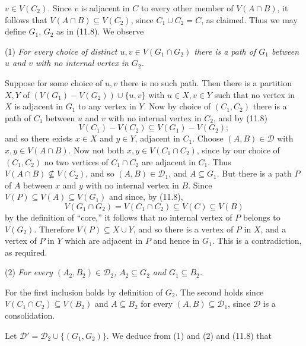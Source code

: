 \noindent $v \in V(C_2)$. Since $v$ is adjacent in $C$ to every other member of $V(A \cap B)$, it follows that $V(A \cap B) \subseteq V(C_2)$, since $C_1 \cup C_2 = C$, as claimed. Thus we may define $G_1$, $G_2$ as in (11.8). We observe

\hspace*{12pt}(1) \textit{For every choice of distinct $u, v \in V(G_1 \cap G_2)$ there is a path of $G_1$ between $u$ and $v$ with no internal vertex in $G_2$.}

Suppose for some choice of $u, v$ there is no such path. Then there is a partition $X, Y$ of $(V(G_1) - V(G_2)) \cup \{u, v\}$ with $u \in X, v \in Y$ such that no vertex in $X$ is adjacent in $G_1$ to any vertex in $Y$. Now by choice of $(C_1, C_2)$ there is a path of $C_1$ between $u$ and $v$ with no internal vertex in $C_2$, and by (11.8)
\begin{equation*}
V(C_1) - V(C_2) \subseteq V(G_1) - V(G_2);
\end{equation*}
and so there exists $x \in X$ and $y \in Y$, adjacent in $C_1$. Choose $(A, B) \in \mathcal{D}$ with $x, y \in V(A \cap B)$. Now not both $x, y \in V(C_1 \cap C_2)$, since by our choice of $(C_1, C_2)$ no two vertices of $C_1 \cap C_2$ are adjacent in $C_1$. Thus $V(A \cap B) \not\subseteq V(C_2)$, and so $(A, B) \in \mathcal{D}_1$, and $A \subseteq G_1$. But there is a path $P$ of $A$ between $x$ and $y$ with no internal vertex in $B$. Since $V(P) \subseteq V(A) \subseteq V(G_1)$ and since, by (11.8),
\begin{equation*}
V(G_1 \cap G_2) = V(C_1 \cap C_2) \subseteq V(C) \subseteq V(B)
\end{equation*}
by the definition of ``core,'' it follows that no internal vertex of $P$ belongs to $V(G_2)$. Therefore $V(P) \subseteq X \cup Y$, and so there is a vertex of $P$ in $X$, and a vertex of $P$ in $Y$ which are adjacent in $P$ and hence in $G_1$. This is a contradiction, as required.

\hspace*{12pt}(2) \textit{For every $(A_2, B_2) \in \mathcal{D}_2$, $A_2 \subseteq G_2$ and $G_1 \subseteq B_2$.}

For the first inclusion holds by definition of $G_2$. The second holds since $V(C_1 \cap C_2) \subseteq V(B_2)$ and $A \subseteq B_2$ for every $(A, B) \subseteq \mathcal{D}_1$, since $\mathcal{D}$ is a consolidation.

Let $\mathcal{D}' = \mathcal{D}_2 \cup \{(G_1, G_2)\}$. We deduce from (1) and (2) and (11.8) that


